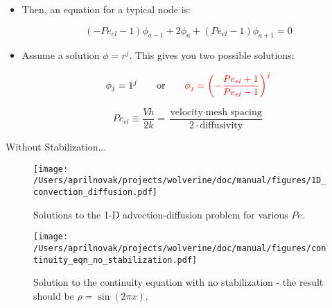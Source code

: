 \documentclass{beamer}
\begin{document}
\begin{frame}
\begin{itemize}
\item Then, an equation for a typical node is:

\begin{equation}
\label{eq:1D_nodal_eq}
(-Pe_{el}-1)\phi_{a-1}+2\phi_a+(Pe_{el}-1)\phi_{a+1}=0
\end{equation}

\item Assume a solution \(\phi=r^j\). This gives you two possible solutions:

\begin{equation}
\phi_j=1^j\quad\quad\text{or}\quad\quad\color{red}\phi_j=\left(-\frac{Pe_{el}+1}{Pe_{el}-1}\right)^j\color{black}
\end{equation}

\begin{equation}
Pe_{el}\equiv\frac{Vh}{2k}=\frac{\text{velocity}\cdot\text{mesh spacing}}{2\cdot\text{diffusivity}}
\end{equation}

\end{itemize}
\end{frame}

\begin{frame}{Without Stabilization...}

\begin{figure}[H]
  \centering
  \texttt{[image: /Users/aprilnovak/projects/wolverine/doc/manual/figures/1D\_convection\_diffusion.pdf]}
  \caption{Solutions to the 1-D advection-diffusion problem for various \(Pe\).}
\end{figure}

\end{frame}


\begin{frame}

\begin{figure}[H]
  \centering
  \texttt{[image: /Users/aprilnovak/projects/wolverine/doc/manual/figures/continuity\_eqn\_no\_stabilization.pdf]}
  \caption{Solution to the continuity equation with no stabilization - the result should be \(\rho=\sin{(2\pi x)}\).}
\end{figure}

\end{frame}

\end{document}
